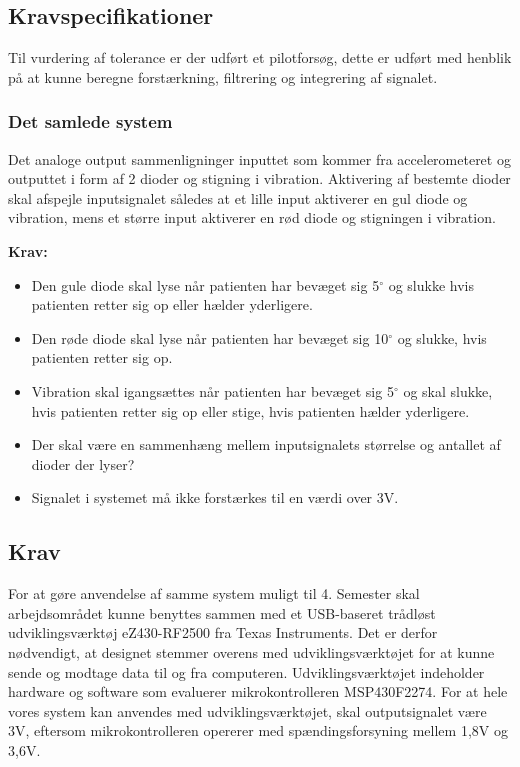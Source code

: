 \subsection{Kravspecifikationer}
Til vurdering af tolerance er der udført et pilotforsøg, dette er udført med henblik på at kunne beregne forstærkning, filtrering og integrering af signalet. 

\subsubsection{Det samlede system}
Det analoge output sammenligninger inputtet som kommer fra accelerometeret og outputtet i form af 2 dioder og stigning i vibration. Aktivering af bestemte dioder skal afspejle inputsignalet således at et lille input aktiverer en gul diode og vibration, mens et større input aktiverer en rød diode og stigningen i vibration. 

\textbf{Krav:}
\begin{itemize}
\item Den gule diode skal lyse når patienten har bevæget sig 5$^{\circ}$ og slukke hvis patienten retter sig op eller hælder yderligere.
\item Den røde diode skal lyse når patienten har bevæget sig 10$^{\circ}$ og slukke, hvis patienten retter sig op.
\item Vibration skal igangsættes når patienten har bevæget sig 5$^{\circ}$ og skal slukke, hvis patienten retter sig op eller stige, hvis patienten hælder yderligere.
\item Der skal være en sammenhæng mellem inputsignalets størrelse og antallet af dioder der lyser?
\item Signalet i systemet må ikke forstærkes til en værdi over 3V.
\end{itemize}

\subsection{Krav}
For at gøre anvendelse af samme system muligt til 4. Semester skal arbejdsområdet kunne benyttes sammen med et USB-baseret trådløst udviklingsværktøj eZ430-RF2500 fra Texas Instruments. Det er derfor nødvendigt, at designet stemmer overens med udviklingsværktøjet for at kunne sende og modtage data til og fra computeren. Udviklingsværktøjet indeholder hardware og software som evaluerer mikrokontrolleren MSP430F2274. For at hele vores system kan anvendes med udviklingsværktøjet, skal outputsignalet være 3V, eftersom mikrokontrolleren opererer med spændingsforsyning mellem 1,8V og 3,6V.

